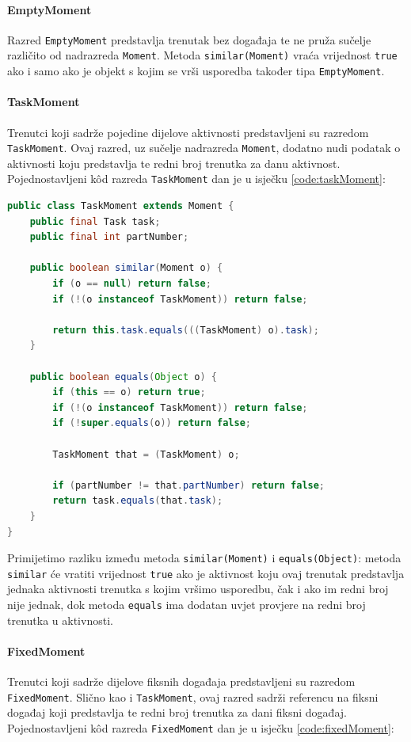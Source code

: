 \documentclass[times, utf8, zavrsni]{fer}
\begin{document}
\paragraph{EmptyMoment} Razred \texttt{EmptyMoment} predstavlja trenutak bez događaja te ne pruža sučelje različito od nadrazreda \texttt{Moment}. Metoda \texttt{similar(Moment)} vraća vrijednost \texttt{true} ako i samo ako je objekt s kojim se vrši usporedba također tipa \texttt{EmptyMoment}.

\paragraph{TaskMoment} Trenutci koji sadrže pojedine dijelove aktivnosti predstavljeni su razredom \texttt{TaskMoment}. Ovaj razred, uz sučelje nadrazreda \texttt{Moment}, dodatno nudi podatak o aktivnosti koju predstavlja te redni broj trenutka za danu aktivnost. Pojednostavljeni k\^{o}d razreda \texttt{TaskMoment} dan je u isječku \ref{code:taskMoment}:

\begin{lstlisting}[language=java, caption=Razred TaskMoment, label={code:taskMoment}]
public class TaskMoment extends Moment {
	public final Task task;
	public final int partNumber;
	
	public boolean similar(Moment o) {
        if (o == null) return false;
        if (!(o instanceof TaskMoment)) return false;

        return this.task.equals(((TaskMoment) o).task);
    }
    
    public boolean equals(Object o) {
        if (this == o) return true;
        if (!(o instanceof TaskMoment)) return false;
        if (!super.equals(o)) return false;

        TaskMoment that = (TaskMoment) o;

        if (partNumber != that.partNumber) return false;
        return task.equals(that.task);
    }
}
\end{lstlisting}
Primijetimo razliku između metoda \texttt{similar(Moment)} i \texttt{equals(Object)}: metoda \texttt{similar} će vratiti vrijednost \texttt{true} ako je aktivnost koju ovaj trenutak predstavlja jednaka aktivnosti trenutka s kojim vršimo usporedbu, čak i ako im redni broj nije jednak, dok metoda \texttt{equals} ima dodatan uvjet provjere na redni broj trenutka u aktivnosti.

\paragraph{FixedMoment} Trenutci koji sadrže dijelove fiksnih događaja predstavljeni su razredom \texttt{FixedMoment}. Slično kao i \texttt{TaskMoment}, ovaj razred sadrži referencu na fiksni događaj koji predstavlja te redni broj trenutka za dani fiksni događaj. Pojednostavljeni k\^{o}d razreda \texttt{FixedMoment} dan je u isječku \ref{code:fixedMoment}:
\end{document}
